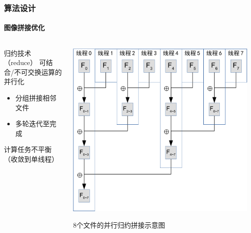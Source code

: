\documentclass{beamer}
\begin{document}
\begin{frame}
    \frametitle{算法设计}
    \framesubtitle{图像拼接优化}

    \begin{columns}
        \begin{column}{0.5\textwidth}
            \begin{block}{归约技术（reduce）}
                \small
                可结合/不可交换运算的并行化
                \begin{itemize}
                    \item 分组拼接相邻文件
                    \item 多轮迭代至完成
                \end{itemize}
                计算任务不平衡（收敛到单线程）
            \end{block}
        \end{column}
        \begin{column}{0.5\textwidth}
            \centering
            \includegraphics[width=0.99\textwidth]{figures/reduce.pdf}
            \begin{tiny}
            8个文件的并行归约拼接示意图
            \end{tiny}
        \end{column}
    \end{columns}
\end{frame}
\end{document}
